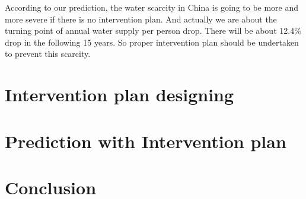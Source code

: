   According to our prediction, the water scarcity in China is going to be more and more severe if there is no intervention plan. And actually we are about the turning point of annual water supply per person drop. There will be about 12.4\% drop in the following 15 years. So proper intervention plan should be undertaken to prevent this scarcity.

\section{Intervention plan designing}

\section{Prediction with Intervention plan}

\section{Conclusion}


